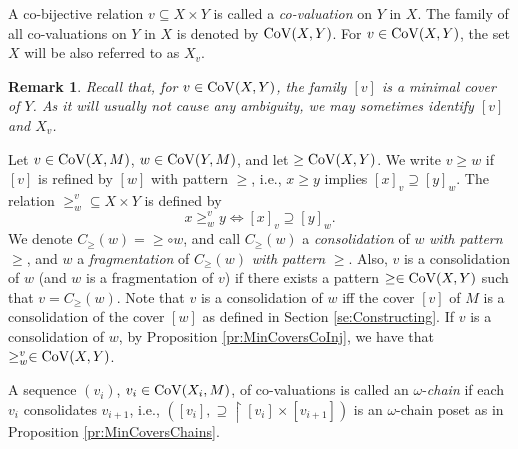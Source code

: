 \documentclass[12pt]{amsart}
\theoremstyle{plain}
\newtheorem{remark}[theorem]{\bf Remark}
\newcommand \Val{{\rm{CoV}}}
\newcommand \uhr{\upharpoonright}
\begin{document}
	
 A co-bijective relation $v \subseteq X \times Y$ is called a \emph{co-valuation} on $Y$ in $X$. The family of all co-valuations on $Y$ in $X$ is denoted by $\Val(X, Y)$.  For $v \in \Val(X,Y)$, the set $X$ will be also referred to as $X_v$. %
	
	
\begin{remark}
\label{re:Identifycotext}
Recall that, for $v \in \Val(X,Y)$, the family $[v]$ is a minimal cover of $Y$. As it will usually not cause any ambiguity, we may sometimes identify $[v]$ and $X_v$.
\end{remark}
	
	
Let $v \in \Val(X, M)$,  $w \in \Val(Y, M)$, and let $\geq \Val(X,Y)$.  We write $v \geq w$ if $[v]$ is refined by $[w]$ with pattern $\geq$, i.e., $x \ge y$ implies $[x]_v \supseteq [y]_w$. The relation $\geq^v_w \subseteq X \times Y$ is defined by
%
$$x \geq^v_w y \Leftrightarrow [x]_v \supseteq [y]_w.$$
%
We denote  $C_\geq(w)=\geq \circ w$, and call $C_\geq(w)$ a \emph{consolidation} of $w$ \emph{with pattern} $\geq$, and $w$ a \emph{fragmentation} of $C_\geq(w)$ \emph{with pattern} $\geq$. Also, $v$ is a consolidation of $w$ (and $w$ is a fragmentation of $v$) if there exists a pattern $\geq \in \Val(X,Y)$ such that $v=C_{\geq} (w)$.  %
Note that $v$ is a consolidation of $w$ iff the cover $[v]$ of $M$ is a consolidation of the cover $[w]$ as defined in Section \ref{se:Constructing}. If $v$ is a consolidation of $w$, by Proposition \ref{pr:MinCoversCoInj}, we have that $\geq^v_w \in \Val(X,Y)$.


A sequence $(v_i)$, $v_i  \in \Val(X_i,M)$, of co-valuations is called an $\omega$-\emph{chain} if each $v_{i}$ consolidates $v_{i+1}$, i.e., $([v_i], \supseteq \uhr [v_i] \times [v_{i+1}])$ is an $\omega$-chain poset as in Proposition \ref{pr:MinCoversChains}.
\end{document}
